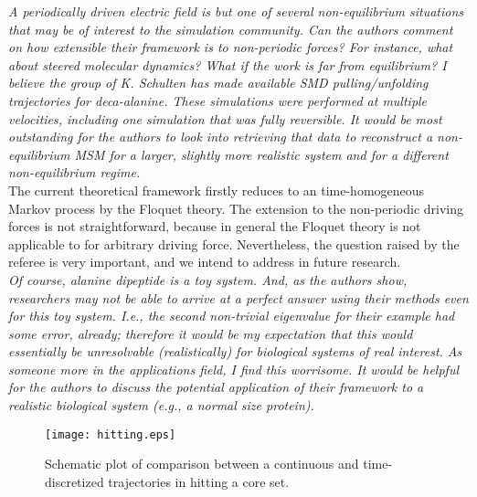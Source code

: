 \documentclass{article}
\begin{document}
\textit{
A periodically driven electric field is but one of several
non-equilibrium situations that may be of interest to the simulation
community.  Can the authors comment on how extensible their framework
is to non-periodic forces?  For instance, what about steered molecular
dynamics?  What if the work is far from equilibrium?  I believe the
group of K. Schulten has made available SMD pulling/unfolding
trajectories for deca-alanine. These simulations were performed at
multiple velocities, including one simulation that was fully
reversible.  It would be most outstanding for the authors to look into
retrieving that data to reconstruct a non-equilibrium MSM for a
larger, slightly more realistic system and for a different
non-equilibrium regime.
}\\

The current theoretical framework firstly reduces to an
time-homogeneous Markov process by the Floquet theory.  The extension
to the non-periodic driving forces is not straightforward, because in
general the Floquet theory is not applicable to for arbitrary driving
force. Nevertheless, the question raised by the referee is very
important, and we intend to address in future research.
\\

\textit{ Of course, alanine dipeptide is a toy system.  And, as the
  authors show, researchers may not be able to arrive at a perfect
  answer using their methods even for this toy system. I.e., the
  second non-trivial eigenvalue for their example had some error,
  already; therefore it would be my expectation that this would
  essentially be unresolvable (realistically) for biological systems
  of real interest.  As someone more in the applications field, I find
  this worrisome. It would be helpful for the authors to discuss the
  potential application of their framework to a realistic biological
  system (e.g., a normal size protein).
}\\


\begin{figure}
  \centering
  \texttt{[image: hitting.eps]}
  \caption{Schematic plot of comparison between a continuous and time-discretized trajectories in hitting a core set.}
  \label{fig:tmp1}
\end{figure}
\end{document}

